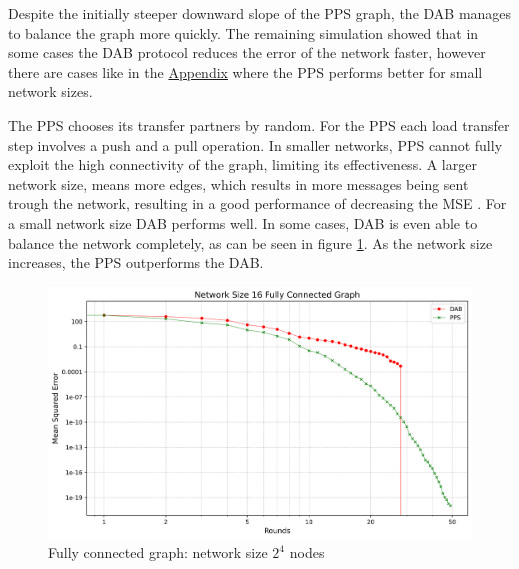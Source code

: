 Despite the initially steeper downward slope of the PPS graph, the DAB manages to balance the graph more quickly. The remaining simulation showed that in some cases the DAB protocol reduces the error of the network faster, however there are cases like in the \hyperref[chap:appendix]{Appendix} where the PPS performs better for small network sizes.

The PPS chooses its transfer partners by random. For the PPS each load transfer step involves a push and a pull operation. In smaller networks, PPS cannot fully exploit the high connectivity of the graph, limiting its effectiveness. A larger network size, means more edges, which results in more messages being sent trough the network, resulting in a good performance of decreasing the MSE \cite{nugroho2023PushPullSumDataAg}. For a small network size DAB performs well. In some cases, DAB is even able to balance the network completely, as can be seen in figure \ref{fig:16CompleteGraph}. As the network size increases, the PPS outperforms the DAB.\\
\begin{figure}[H]
    \centering
    \includegraphics[scale=0.5]{figures/completeGraphSimulations/DAB_vs_PPS_FCG_r50_n16.png}
    \caption{Fully connected graph: network size $2^{4}$ nodes}
    \label{fig:16CompleteGraph}
\end{figure}

